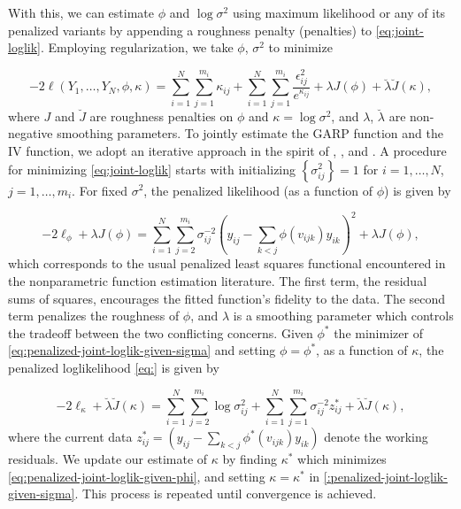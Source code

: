 \documentclass[12pt]{article}
\theoremstyle{definition}
\begin{document}
\bigskip

With this, we can estimate $\phi$ and $\log\sigma^2$ using maximum likelihood or any of its penalized variants by appending a roughness penalty (penalties) to \ref{eq:joint-loglik}. Employing regularization, we take $\phi$, $\sigma^2$ to minimize 

\begin{equation} \label{eq:penalized-joint-loglik}
-2\ell\left( Y_1,\dots, Y_N, \phi, \kappa \right) = \sum_{i = 1}^N \sum_{j = 1}^{m_i} \kappa_{ij}  + \sum_{i = 1}^N \sum_{j = 1}^{m_i} \frac {\epsilon_{ij}^2}{e^{\kappa_{ij}}} +  \lambda J\left( \phi \right) +  \breve{\lambda}\breve{J}\left( \kappa \right),
\end{equation}
\noindent
where $J$ and $\breve{J}$ are roughness penalties on $\phi$ and $\kappa = \log\sigma^2$, and $\lambda$, $\breve{\lambda}$ are non-negative smoothing parameters.  To jointly estimate the GARP function and the IV function, we adopt an iterative approach in the spirit of \citet{huang2006covariance}, \citet{huang2007estimation}, and \citet{pourahmadi2000maximum}. A procedure for minimizing \ref{eq:joint-loglik} starts with initializing $\left\{\sigma^2_{ij}\right\} = 1$ for $i = 1,\dots, N$, $j = 1,\dots, m_i$.  For fixed $\sigma^2$, the penalized likelihood (as a function of $\phi$) is given by

\begin{equation} \label{eq:penalized-joint-loglik-given-sigma}
-2\ell_\phi + \lambda J\left(\phi\right) = \sum_{i=1}^N \sum_{j=2}^{m_i} \sigma^{-2}_{ij}\left( y_{ij} - \sum_{k<j} \phi\left(v_{ijk}\right) y_{ik}  \right)^2 + \lambda J\left( \phi \right),
\end{equation}
\noindent
which corresponds to the usual penalized least squares functional encountered  in the nonparametric function estimation literature. The first term, the residual sums of squares, encourages the fitted function's fidelity to the data. The second term penalizes the roughness of $\phi$, and $\lambda$ is a smoothing parameter which controls the tradeoff between the two conflicting concerns. Given $\phi^*$ the minimizer of \ref{eq:penalized-joint-loglik-given-sigma} and setting $\phi = \phi^*$, as a function of $\kappa$, the penalized loglikelihood \ref{eq:} is given by  

\begin{equation} \label{eq:penalized-joint-loglik-given-phi}
-2\ell_\kappa + \breve{\lambda} \breve{J}\left(\kappa\right) = \sum_{i=1}^N \sum_{j=2}^{m_i} \log \sigma^2_{ij} + \sum_{i=1}^N \sum_{j=1}^{m_i} \sigma_{ij}^{-2} {z_{ij}^*} + \breve{\lambda} \breve{J}\left( \kappa \right),
\end{equation}
where the current data $z_{ij}^* =\left( y_{ij} - \sum_{k<j} \phi^*\left(v_{ijk}\right) y_{ik}  \right)$ denote the working residuals.  We update our estimate of $\kappa$ by finding $\kappa^*$ which minimizes \ref{eq:penalized-joint-loglik-given-phi}, and setting $\kappa = \kappa^*$ in \ref{:penalized-joint-loglik-given-sigma}. This process is repeated until convergence is achieved. 
\bigskip
\end{document}

